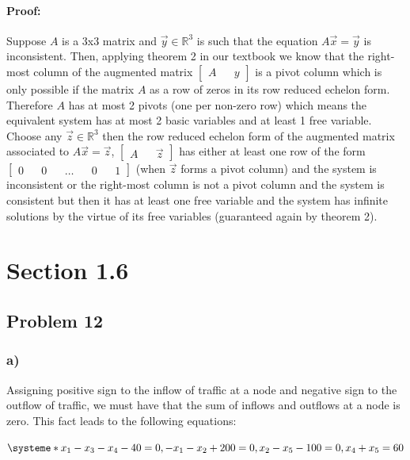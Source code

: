 \documentclass[12pt, letterpaper]{article}
\newcommand{\R}{\mathbb{R}}
\theoremstyle{statement}
\newenvironment{atmProof}{\noindent\ignorespaces\paragraph{Proof:}}{\hfill \ding{122}\par\noindent}
\begin{document}
            \begin{atmProof}
            Suppose $A$ is a 3x3 matrix and $\vec{y} \in \R^3$ is such that the equation $A\vec{x} = \vec{y}$ is inconsistent. Then, applying theorem 2 in our textbook we know that the right-most column of the augmented matrix $\begin{bmatrix} A && y\end{bmatrix}$ is a pivot column which is only possible if the matrix $A$ as a row of zeros in its row reduced echelon form. Therefore $A$ has at most 2 pivots (one per non-zero row) which means the equivalent system has at most 2 basic variables and at least 1 free variable. 
            Choose any $\vec{z} \in \R^3$ then the row reduced echelon form of the augmented matrix associated to $A\vec{x} = \vec{z}$, $\begin{bmatrix} A && \vec{z} \end{bmatrix}$ has either at least one row of the form $\begin{bmatrix} 0 && 0 && \dots && 0 && 1 \end{bmatrix}$ (when $\vec{z}$ forms a pivot column) and the system is inconsistent or the right-most column is not a pivot column and the system is consistent but then it has at least one free variable and the system has infinite solutions by the virtue of its free variables (guaranteed again by theorem 2).
            \end{atmProof}

        \section*{Section 1.6}
            \subsection*{Problem 12}
            \subsubsection*{a)}
            
            Assigning positive sign to the inflow of traffic at a node and negative sign to the outflow of traffic, we must have that the sum of inflows and outflows at a node is zero. This fact leads to the following equations: 
               
               
                 $\\\systeme* {
                x_1 - x_3 - x_4 - 40 = 0 ,
                -x_1 - x_2 + 200 = 0 ,
                x_2 - x_5 - 100 = 0 ,
                x_4 + x_5 = 60 
            }\\ $  
            
\end{document}
